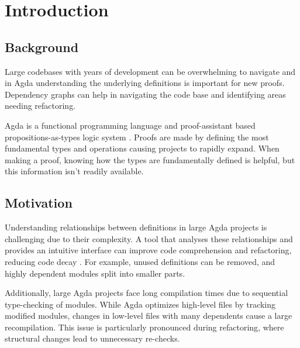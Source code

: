 
\chapter{Introduction}


\section{Background}

Large codebases with years of development can be overwhelming to navigate
\cite{code_decay} and in Agda understanding the underlying definitions is
important for new proofs. Dependency graphs can help in navigating the code
base and identifying areas needing refactoring\cite{dep_grah_refactoring}.

Agda is a functional programming language and proof-assistant based
propositions-as-types logic system \cite{agda_docs}. Proofs are made by
defining the most fundamental types and operations causing projects to rapidly
expand. When making a proof, knowing how the types are fundamentally defined is
helpful, but this information isn't readily available.

\section{Motivation}


Understanding relationships between definitions in large Agda projects is
challenging due to their complexity. A tool that analyses these relationships
and provides an intuitive interface can improve code comprehension and
refactoring, reducing code decay \cite{fowler2018refactoring}. For example,
unused definitions can be removed, and highly dependent modules split into
smaller parts. 

Additionally, large Agda projects face long compilation times due to sequential
type-checking of modules. While Agda optimizes high-level files by tracking
modified modules, changes in low-level files with many dependents cause
a large recompilation. This issue is particularly pronounced during
refactoring, where structural changes lead to unnecessary re-checks. 

